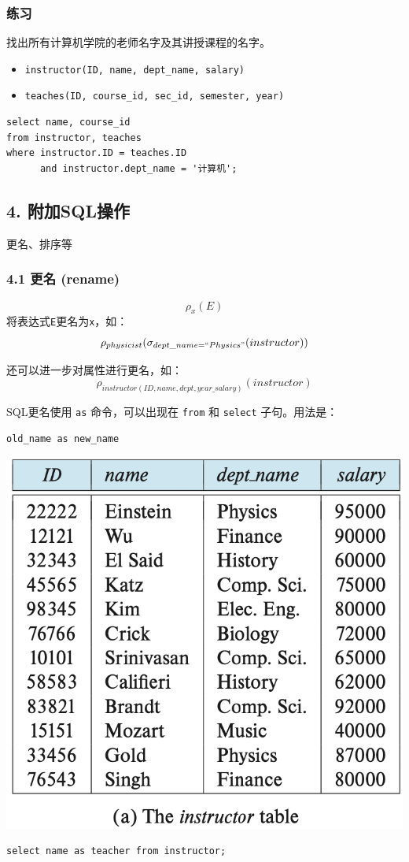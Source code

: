 \documentclass[aspectratio=169, 14pt]{beamer}
\begin{document}
\begin{frame}[fragile]
    \frametitle{练习}
    找出所有计算机学院的老师名字及其讲授课程的名字。

\begin{itemize}
    \item \texttt{instructor(ID, name, dept\_name, salary)}
    \item \texttt{teaches(ID, course\_id, sec\_id, semester, year)}
\end{itemize}
    \pause
    \begin{verbatim} 
select name, course_id
from instructor, teaches
where instructor.ID = teaches.ID 
      and instructor.dept_name = '计算机';
    \end{verbatim}    
\end{frame}
\begin{frame}
    \section{\textcolor{darkmidnightblue}{4. 附加SQL操作}} 
更名、排序等
\end{frame}
\begin{frame}
    \frametitle{4.1 更名 (rename)}
{\large \[\rho_x(E)\]}
将表达式\texttt{E}更名为\texttt{x}，如：\[\rho_{physicist}(\sigma_{dept\_name=``Physics"}(instructor))\]

还可以进一步对属性进行更名，如：\[\rho_{instructor(ID, name, dept, year\_salary)}(instructor)\]

\end{frame}

\begin{frame}[fragile]
    SQL更名使用 \texttt{as} 命令，可以出现在 \texttt{from} 和 \texttt{select} 子句。用法是：
\begin{verbatim}
old_name as new_name    
\end{verbatim}

\includegraphics[width=.6\textwidth,trim={0cm 8.5cm 0cm 0cm},clip]{table/instructor}

\begin{verbatim} 
select name as teacher from instructor;
\end{verbatim} 

\end{frame}
\end{document}
